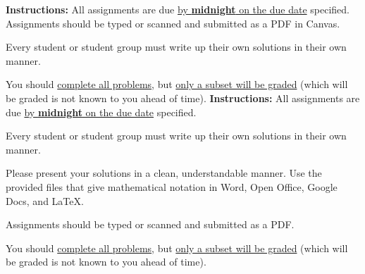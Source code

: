 \newcommand{\CMX}{\text{CMX}}
\newcommand{\ORD}{\text{ORD}}
\newcommand{\DTW}{\text{DTW}}
\newcommand{\MQT}{\text{MQT}}
\newcommand{\MSP}{\text{MSP}}



\extrawidth{0.5in} \extrafootheight{-0in} \pagestyle{headandfoot}
\headrule {} \footrule {}

\ifprintanswers
\noindent \textbf{Instructions:} All assignments are due \underline{by
\textbf{midnight} on the due date} specified.  Assignments should be typed or
scanned and submitted as a PDF in Canvas.

\medskip
\noindent Every student or student group must write up their own solutions in
their own manner.

\medskip
\noindent You should \underline{complete all problems}, but \underline{only a
subset will be graded} (which will be graded is not known to you ahead of
time).
\else
\noindent \textbf{Instructions:} All assignments are due \underline{by \textbf{midnight} on the due date} specified.

\medskip
\noindent Every student or student group  must write up their own solutions in
their own manner.

\medskip
\noindent Please present your solutions in a clean, understandable
manner.  Use the provided files that give mathematical notation in Word, Open Office, Google Docs, and \LaTeX.

\medskip
\noindent Assignments should be typed or scanned and submitted as a PDF.

\medskip
\noindent You should \underline{complete all problems}, but \underline{only a
subset will be graded} (which will be graded is not known to you ahead of
time).
\fi

